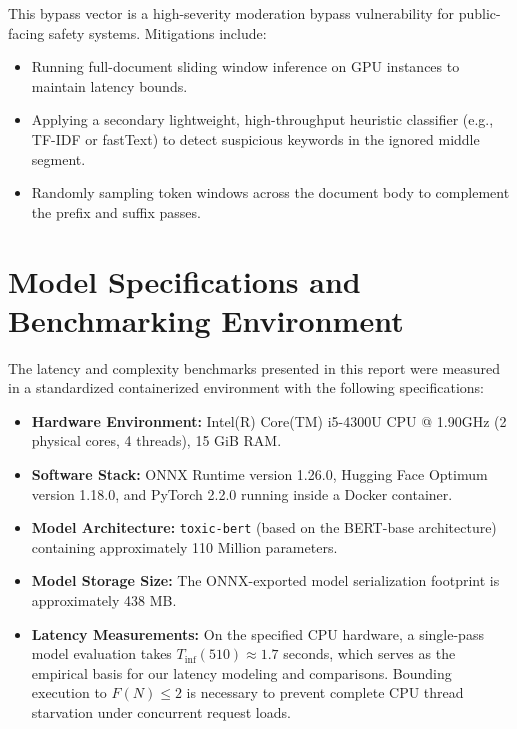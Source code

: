 \documentclass[10pt]{article}
\begin{document}
This bypass vector is a high-severity moderation bypass vulnerability for public-facing safety systems. Mitigations include:
\begin{itemize}
\item Running full-document sliding window inference on GPU instances to maintain latency bounds.
\item Applying a secondary lightweight, high-throughput heuristic classifier (e.g., TF-IDF or fastText) to detect suspicious keywords in the ignored middle segment.
\item Randomly sampling token windows across the document body to complement the prefix and suffix passes.
\end{itemize}

\section{Model Specifications and Benchmarking Environment}
The latency and complexity benchmarks presented in this report were measured in a standardized containerized environment with the following specifications:
\begin{itemize}
\item \textbf{Hardware Environment:} Intel(R) Core(TM) i5-4300U CPU @ 1.90GHz (2 physical cores, 4 threads), 15 GiB RAM.
\item \textbf{Software Stack:} ONNX Runtime version 1.26.0, Hugging Face Optimum version 1.18.0, and PyTorch 2.2.0 running inside a Docker container.
\item \textbf{Model Architecture:} \texttt{toxic-bert} (based on the BERT-base architecture) containing approximately 110 Million parameters.
\item \textbf{Model Storage Size:} The ONNX-exported model serialization footprint is approximately 438 MB.
\item \textbf{Latency Measurements:} On the specified CPU hardware, a single-pass model evaluation takes $T_{\text{inf}}(510) \approx 1.7$ seconds, which serves as the empirical basis for our latency modeling and comparisons. Bounding execution to $F(N) \le 2$ is necessary to prevent complete CPU thread starvation under concurrent request loads.
\end{itemize}
\end{document}

